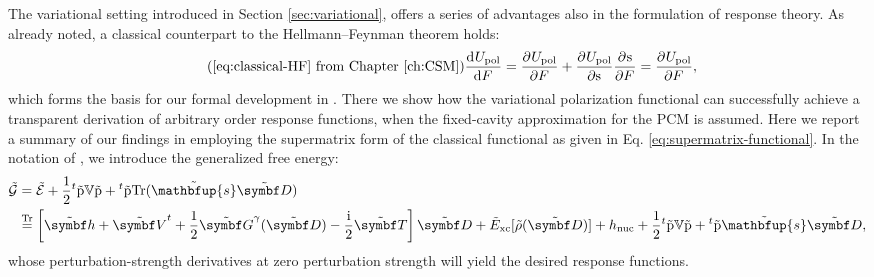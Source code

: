 The variational setting introduced in Section \ref{sec:variational},
offers a series of advantages also in the formulation of response
theory. As already noted, a classical counterpart to the
Hellmann--Feynman theorem holds:
\begin{equation}\tag{\ref{eq:classical-HF} from Chapter \ref{ch:CSM}}
  \deriv{U_\mathrm{pol}}{F} = \pderiv{U_\mathrm{pol}}{F}
  + \pderiv{U_\mathrm{pol}}{\s}\pderiv{\s}{F}
  = \pderiv{U_\mathrm{pol}}{F},
\end{equation}
which forms the basis for our formal development in
.\autocite{pcm-openrsp}
There we show how the variational polarization functional can
successfully achieve a transparent derivation of arbitrary order
response functions, when the fixed-cavity approximation for the
\acrshort{PCM} is assumed.
Here we report a summary of our findings in  employing the
supermatrix form of the classical functional as given in Eq.
\eqref{eq:supermatrix-functional}.
In the notation of \citeauthor{Thorvaldsen2008-sg}, we introduce the
generalized free energy:
\begin{equation}\label{eq:generalized-KS-energy}
  \begin{aligned}
 \tilde{\mathcal{G}}
 &=
 \tilde{\mathcal{E}}
 + \frac{1}{2}{}^t\tilde{\p}\V\tilde{\p} +
 {}^t\tilde{\p}\Tr(\tilde{\mathbfup{s}}\pertmat{D}) \\
 &\eqtr
 \left[\pertmat{h} + \pertmat{V}^{t} +
 \frac{1}{2}\pertmat{G}^{\gamma}(\pertmat{D}) -
 \frac{\mathrm{i}}{2}\pertmat{T}\right]\pertmat{D}
 + \tilde{E}_\mathrm{xc}[\tilde{\rho}(\pertmat{D})] + h_\mathrm{nuc}
 + \frac{1}{2}{}^t\tilde{\p}\V\tilde{\p}
 + {}^t\tilde{\p}\tilde{\mathbfup{s}}\pertmat{D},
 \end{aligned}
\end{equation}
whose perturbation-strength derivatives at zero perturbation strength
will yield the desired response functions.

